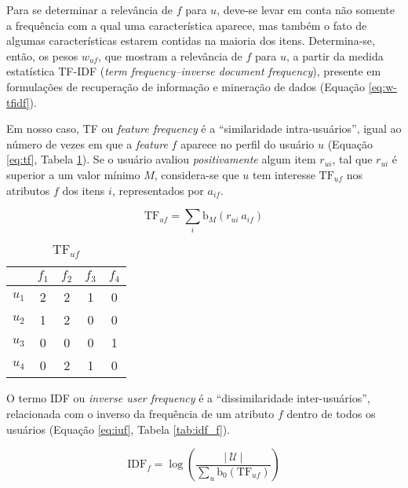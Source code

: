 Para se determinar a relevância de $f$ para $u$, deve-se levar em conta não somente a frequência com a qual uma característica aparece, mas também o fato de algumas características estarem contidas na maioria dos itens. Determina-se, então, os pesos $w_{uf}$, que mostram a relevância de $f$ para $u$, a partir da medida estatística TF-IDF (\textit{term frequency--inverse document frequency}), presente em formulações de recuperação de informação e mineração de dados (Equação \ref{eq:w-tfidf}). 

Em nosso caso, TF ou \textit{feature frequency} é a ``similaridade intra-usuários'', igual ao número de vezes em que a \textit{feature} $f$ aparece no perfil do usuário $u$ (Equação \ref{eq:tf}, Tabela \ref{tab:tf_uf}). Se o usuário avaliou \textit{positivamente} algum item $r_{ui}$, tal que $r_{ui}$ é superior a um valor mínimo $M$, considera-se que $u$ tem interesse $\mathrm{TF}_{uf}$ nos atributos $f$ dos itens $i$, representados por $a_{if}$. 

\begin{equation}
\label{eq:tf} 
    \mathrm{TF}_{uf}  = \sum_{i}{\mathrm{b}_M\left(r_{ui}~a_{if}\right)} 
\end{equation} 

\begin{table}[p]
\begin{center}
    \caption{$\mathrm{TF}_{uf}$}
    \label{tab:tf_uf}
    \begin{tabular}{ | c | c | c | c | c | } 
    \hline
     & $f_1$ & $f_2$ & $f_3$ & $f_4$   \\ \hline
     $u_1$ & 2 & 2 & 1 & 0  \\ \hline
     $u_2$ & 1 & 2 & 0 & 0  \\ \hline
     $u_3$ & 0 & 0 & 0 & 1  \\ \hline
     $u_4$ & 0 & 2 & 1 & 0  \\ \hline
    \end{tabular}
\end{center}
\end{table}

O termo IDF ou \textit{inverse user frequency} é a ``dissimilaridade inter-usuários'', relacionada com o inverso da frequência de um atributo $f$ dentro de todos os usuários (Equação \ref{eq:iuf}, Tabela \ref{tab:idf_f}).

\begin{equation}
\label{eq:iuf} 
    \mathrm{IDF}_{f} = \log \left( \frac{\left|~\mathcal{U}~\right|}{\sum_{u}{\mathrm{b}_0\left(\mathrm{TF}_{uf}\right)}} \right)
\end{equation} 

